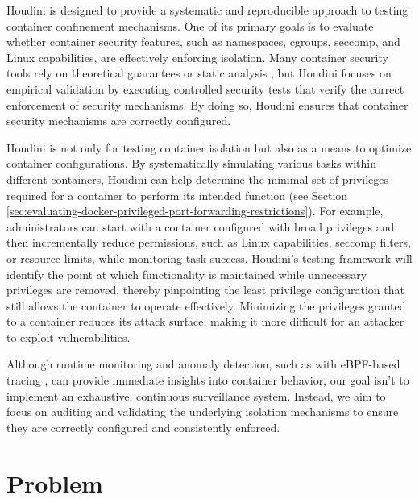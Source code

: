 \documentclass[12pt]{report}
\begin{document}
\begin{doublespace}
Houdini is designed to provide a systematic and reproducible approach to testing container confinement mechanisms. One of its primary goals is to evaluate whether container security features, such as namespaces, cgroups, seccomp, and Linux capabilities, are effectively enforcing isolation. Many container security tools rely on theoretical guarantees or static analysis \cite{clair}, but Houdini focuses on empirical validation by executing controlled security tests that verify the correct enforcement of security mechanisms. By doing so, Houdini ensures that container security mechanisms are correctly configured.

Houdini is not only for testing container isolation but also as a means to optimize container configurations. By systematically simulating various tasks within different containers, Houdini can help determine the minimal set of privileges required for a container to perform its intended function (see Section \ref{sec:evaluating-docker-privileged-port-forwarding-restrictions}). For example, administrators can start with a container configured with broad privileges and then incrementally reduce permissions, such as Linux capabilities, seccomp filters, or resource limits, while monitoring task success. Houdini’s testing framework will identify the point at which functionality is maintained while unnecessary privileges are removed, thereby pinpointing the least privilege configuration that still allows the container to operate effectively. Minimizing the privileges granted to a container reduces its attack surface, making it more difficult for an attacker to exploit vulnerabilities.

Although runtime monitoring and anomaly detection, such as with eBPF-based tracing \cite{findlay2021bpfcontain}, can provide immediate insights into container behavior, our goal isn't to implement an exhaustive, continuous surveillance system. Instead, we aim to focus on auditing and validating the underlying isolation mechanisms to ensure they are correctly configured and consistently enforced.




\section{Problem}


\end{doublespace}
\end{document}
